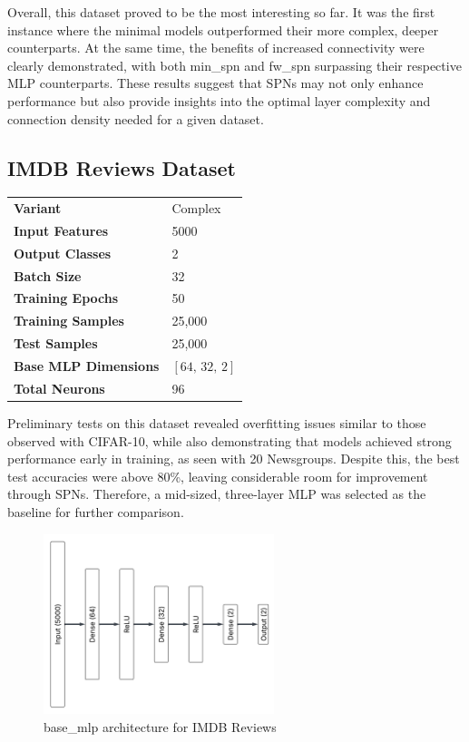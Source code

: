 Overall, this dataset proved to be the most interesting so far. It was the first instance where the minimal models outperformed their more complex, deeper counterparts. At the same time, the benefits of increased connectivity were clearly demonstrated, with both min\_spn and fw\_spn surpassing their respective MLP counterparts. These results suggest that SPNs may not only enhance performance but also provide insights into the optimal layer complexity and connection density needed for a given dataset.

\subsection{IMDB Reviews Dataset}

\begin{tabular}{@{}ll@{}}
\textbf{Variant} & Complex \\
\textbf{Input Features} & 5000 \\
\textbf{Output Classes} & 2 \\
\textbf{Batch Size} & 32 \\
\textbf{Training Epochs} & 50 \\
\textbf{Training Samples} & 25,000 \\
\textbf{Test Samples} & 25,000 \\
\textbf{Base MLP Dimensions} & $[64,\, 32,\, 2]$ \\
\textbf{Total Neurons} & 96 \\
\end{tabular}

\vspace{2pt}
Preliminary tests on this dataset revealed overfitting issues similar to those observed with CIFAR-10, while also demonstrating that models achieved strong performance early in training, as seen with 20 Newsgroups. Despite this, the best test accuracies were above 80\%, leaving considerable room for improvement through SPNs. Therefore, a mid-sized, three-layer MLP was selected as the baseline for further comparison.

\begin{figure}[H]
    \centering
    \includegraphics[height=0.28\textheight,width=0.6\textwidth]{Figures/Results/IMDB/IMDB_base_mlp_architecture.png} 
    \captionsetup{justification=centering}  %
    \caption{base\_mlp architecture for IMDB Reviews}
    \label{fig:imdbMlpBaseArch}
\end{figure}

